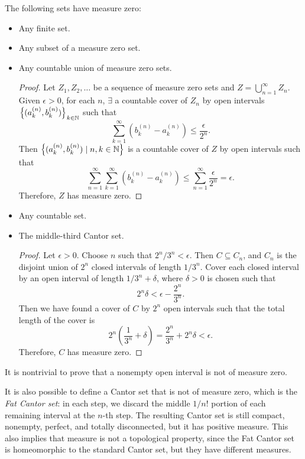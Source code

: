 \begin{prop}
    The following sets have measure zero:
    \begin{itemize}
        \item Any finite set.
        \item Any subset of a measure zero set.
        \item Any countable union of measure zero sets.
        \begin{proof}
            Let $Z_1, Z_2, \ldots$ be a sequence of measure zero sets and $Z = \bigcup_{n=1}^\infty Z_n$. Given $\epsilon > 0$, for each $n$, $\exists$ a countable cover of $Z_n$ by open intervals ${\left\{{(a_k^{(n)}, b_k^{(n)})}\right\}}_{k \in {\mathbb N}}$ such that
            \[
            \sum_{k=1}^\infty (b_k^{(n)} - a_k^{(n)}) \leq \frac{\epsilon}{2^n}.
            \]
            Then ${\left\{{(a_k^{(n)}, b_k^{(n)}) \mid n, k \in {\mathbb N}}\right\}}$ is a countable cover of $Z$ by open intervals such that
            \[
            \sum_{n=1}^\infty \sum_{k=1}^\infty (b_k^{(n)} - a_k^{(n)}) \leq \sum_{n=1}^\infty \frac{\epsilon}{2^n} = \epsilon.
            \]
            Therefore, $Z$ has measure zero.
        \end{proof}
        \item Any countable set.
        \item The middle-third Cantor set.
        \begin{proof}
            Let $\epsilon > 0$. Choose $n$ such that $2^n/3^n < \epsilon$. Then $C \subseteq C_n$, and $C_n$ is the disjoint union of $2^n$ closed intervals of length $1/3^n$. Cover each closed interval by an open interval of length $1/3^n + \delta$, where $\delta > 0$ is chosen such that
            \[
            2^n \delta < \epsilon - \frac{2^n}{3^n}.
            \]
            Then we have found a cover of $C$ by $2^n$ open intervals such that the total length of the cover is
            \[
            2^n \left(\frac{1}{3^n} + \delta\right) = \frac{2^n}{3^n} + 2^n \delta < \epsilon.
            \]
            Therefore, $C$ has measure zero.
        \end{proof}
    \end{itemize}
\end{prop}

\begin{rmk}
    It is nontrivial to prove that a nonempty open interval is not of measure zero. 
\end{rmk}

It is also possible to define a Cantor set that is not of measure zero, which is the \textit{Fat Cantor set}: in each step, we discard the middle $1/n!$ portion of each remaining interval at the $n$-th step. The resulting Cantor set is still compact, nonempty, perfect, and totally disconnected, but it has positive measure. This also implies that measure is not a topological property, since the Fat Cantor set is homeomorphic to the standard Cantor set, but they have different measures.

